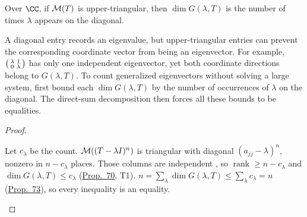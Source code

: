 \documentclass[10pt]{scrartcl}
\begin{document}
\begin{proposition*}\hypertarget{name-ladr-8-31-diagonal-of-a-triangular-matrix}{}\label{name-ladr-8-31-diagonal-of-a-triangular-matrix}
  Over $\CC$, if $\mathcal M(T)$ is upper-triangular, then $\dim G(\lambda,T)$ is the number of times $\lambda$ appears on the diagonal.
\end{proposition*}
\begin{ideabox}
A diagonal entry records an eigenvalue, but upper-triangular entries can prevent the corresponding coordinate vector from being an eigenvector. For example, $\begin{psmallmatrix}\lambda&1\\0&\lambda\end{psmallmatrix}$ has only one independent eigenvector, yet both coordinate directions belong to $G(\lambda,T)$. To count generalized eigenvectors without solving a large system, first bound each $\dim G(\lambda,T)$ by the number of occurrences of $\lambda$ on the diagonal. The direct-sum decomposition then forces all these bounds to be equalities.
\end{ideabox}
\begin{proof}
  \begin{steps}
    \ii Let $c_\lambda$ be the count. $\mathcal M((T-\lambda I)^n)$ is triangular with diagonal $(a_{jj}-\lambda)^n$, nonzero in $n-c_\lambda$ places.
    \ii Those columns are independent , so $\operatorname{rank}\ge n-c_\lambda$ and $\dim G(\lambda,T)\le c_\lambda$ (\hyperref[prop-70]{Prop.~70}, T1).
    \ii $n=\sum_\lambda\dim G(\lambda,T)\le\sum_\lambda c_\lambda=n$ (\hyperref[prop-73]{Prop.~73}), so every inequality is an equality.
  \end{steps}
\end{proof}
\end{document}
